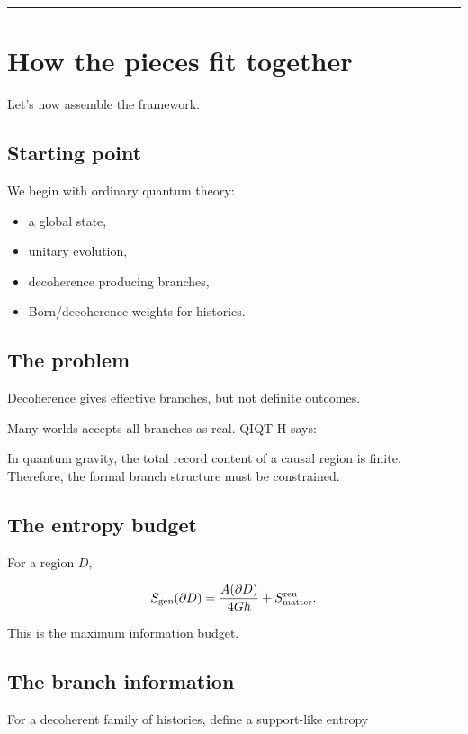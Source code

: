 \documentclass[11pt,a4paper]{article}
\newenvironment{qiqtquote}{\begin{mdframed}[style=quotestyle]}{\end{mdframed}}
\begin{document}
\medskip\hrule\medskip

\section{How the pieces fit together}

Let’s now assemble the framework.

\subsection{Starting point}

We begin with ordinary quantum theory:

\begin{itemize}
  \item a global state,
  \item unitary evolution,
  \item decoherence producing branches,
  \item Born/decoherence weights for histories.
\end{itemize}

\subsection{The problem}

Decoherence gives effective branches, but not definite outcomes.

Many-worlds accepts all branches as real. QIQT-H says:

\begin{qiqtquote}
In quantum gravity, the total record content of a causal region is finite. Therefore, the formal branch structure must be constrained.
\end{qiqtquote}

\subsection{The entropy budget}

For a region $D$,

\[
S_{\rm gen}(\partial D)
=
\frac{A(\partial D)}{4G\hbar}
+
S_{\rm matter}^{\rm ren}.
\]

This is the maximum information budget.

\subsection{The branch information}

For a decoherent family of histories, define a support-like entropy
\end{document}
